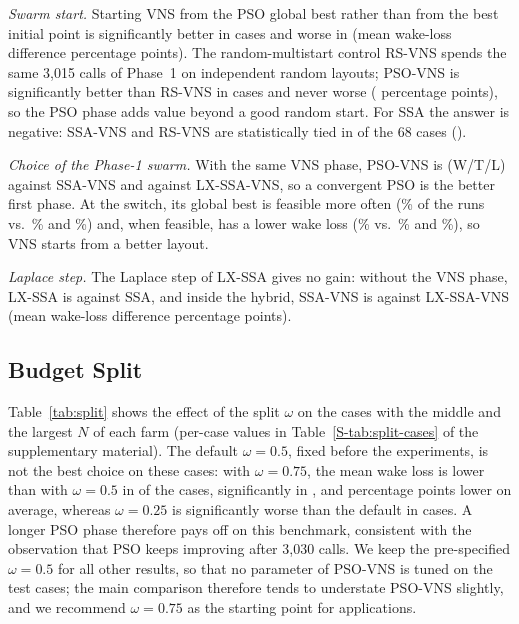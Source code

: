 \documentclass[journal,twoside]{IEEEtran}
\begin{document}
\emph{Swarm start.} Starting VNS from the PSO global best rather than from the best initial point is significantly better in \NAblPSOVNSvsVNSW{} cases and worse in \NAblPSOVNSvsVNSL{} (mean wake-loss difference \NAblPSOVNSvsVNSDL{} percentage points). The random-multistart control RS-VNS spends the same 3,015 calls of Phase~1 on independent random layouts; PSO-VNS is significantly better than RS-VNS in \NAblPSOVNSvsRSVNSW{} cases and never worse (\NAblPSOVNSvsRSVNSDL{} percentage points), so the PSO phase adds value beyond a good random start. For SSA the answer is negative: SSA-VNS and RS-VNS are statistically tied in \NAblSSAVNSvsRSVNST{} of the 68 cases (\NAblSSAVNSvsRSVNS).

\emph{Choice of the Phase-1 swarm.} With the same VNS phase, PSO-VNS is \NAblPSOVNSvsSSAVNS{} (W/T/L) against SSA-VNS and \NAblPSOVNSvsLXSSAVNS{} against LX-SSA-VNS, so a convergent PSO is the better first phase. At the switch, its global best is feasible more often (\NSwitchFeasPSOVNS\% of the runs vs.\ \NSwitchFeasSSAVNS\% and \NSwitchFeasLXSSAVNS\%) and, when feasible, has a lower wake loss (\NSwitchLossPSOVNS\% vs.\ \NSwitchLossSSAVNS\% and \NSwitchLossLXSSAVNS\%), so VNS starts from a better layout.

\emph{Laplace step.} The Laplace step of LX-SSA gives no gain: without the VNS phase, LX-SSA is \NAblLXSSAvsSSA{} against SSA, and inside the hybrid, SSA-VNS is \NAblSSAVNSvsLXSSAVNS{} against LX-SSA-VNS (mean wake-loss difference \NAblSSAVNSvsLXSSAVNSDL{} percentage points).

\subsection{Budget Split}
\label{sec:split}

Table~\ref{tab:split} shows the effect of the split $\omega$ on the \NSplitCases{} cases with the middle and the largest $N$ of each farm (per-case values in Table~\ref{S-tab:split-cases} of the supplementary material). The default $\omega=0.5$, fixed before the experiments, is not the best choice on these cases: with $\omega=0.75$, the mean wake loss is lower than with $\omega=0.5$ in \NSplitSeventyFiveLower{} of the \NSplitCases{} cases, significantly in \NSplitSeventyFiveSig, and \NSplitGainSeventyFive{} percentage points lower on average, whereas $\omega=0.25$ is significantly worse than the default in \NSplitTwentyFiveSig{} cases. A longer PSO phase therefore pays off on this benchmark, consistent with the observation that PSO keeps improving after 3,030 calls. We keep the pre-specified $\omega=0.5$ for all other results, so that no parameter of PSO-VNS is tuned on the test cases; the main comparison therefore tends to understate PSO-VNS slightly, and we recommend $\omega=0.75$ as the starting point for applications.
\end{document}
